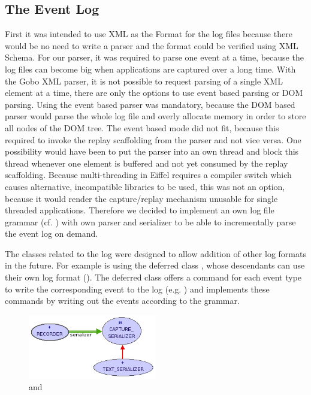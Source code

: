 \subsection{The Event Log}
First it was intended to use XML as the Format for the log files because there would be no need to write a parser and the format could be verified using XML Schema. For our parser, it was required to parse one event at a time, because the log files can become big when applications are captured over a long time. With the Gobo XML parser, it is not possible to request parsing of a single XML element at a time, there are only the options to use event based parsing or DOM parsing. Using the event based parser was mandatory, because the DOM based parser would parse the whole log file and overly allocate memory in order to store all nodes of the DOM tree. The event based mode did not fit, because this required to invoke the replay scaffolding from the parser and not vice versa. One possibility would have been to put the parser into an own thread and block this thread whenever one element is buffered and not yet consumed by the replay scaffolding. Because multi-threading in Eiffel requires a compiler switch which causes alternative, incompatible libraries to be used, this was not an option, because it would render the capture/replay mechanism unusable for single threaded applications.
Therefore we decided to implement an own log file grammar (cf. ) with own parser and serializer to be able to incrementally parse the event log on demand.


The classes related to the log were designed to allow addition of other log formats in the future. For example  is using the deferred class , whose descendants can use their own log format (). The deferred class offers a command for each event type to write the corresponding event to the log (e.g. ) and  implements these commands by writing out the events according to the grammar.

\begin{figure}[ht]
  \centering
  \includegraphics[width=0.5\textwidth]{illustrations/implementation_serializer.png}
  \caption{ and }
  \label{fig:implementation_serializer}
\end{figure}

